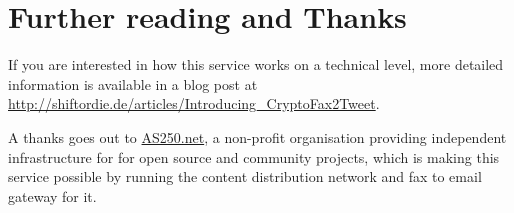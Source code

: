 \documentclass[DIV14,11pt]{scrartcl}
\begin{document}
\section*{Further reading and Thanks}

If you are interested in how this service works on a technical level, more detailed
	information is available in a blog post at \href{http://shiftordie.de/articles/Introducing\_CryptoFax2Tweet}{http://shiftordie.de/articles/Introducing\_CryptoFax2Tweet}.

A thanks goes out to \href{https://as250.net}{AS250.net}, a non-profit organisation providing
	independent infrastructure for for open source and community projects, which
	is making this service possible by running the content distribution network
	and fax to email gateway for it.
\end{document}

